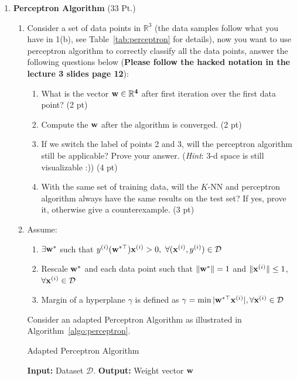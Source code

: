 \documentclass{article}
\theoremstyle{definition}
\theoremstyle{remark}
\newenvironment{Q}
        {%
          \clearpage
          \item
        }
        {%
          \phantom{s} 
          \bigskip
        }
\begin{document}
\begin{enumerate}[font={\Large\bfseries},left=0pt]
\begin{Q}
\textbf{\Large Perceptron Algorithm} (33 Pt.)
\begin{enumerate}
    \item Consider a set of data points in $\mathbb{R}^3$ (the data samples follow
what you have in 1(b), see Table~\ref{tab:perceptron} for details)\label{}, now you want to use perceptron algorithm to correctly classify all the data points, answer the following questions below (\textbf{Please follow the hacked notation in the lecture 3 slides page 12}):
      
      \begin{enumerate}
          \item    What is the vector $\bf{w} \in \mathbb{R}^4$ after first iteration over the first data point? (2 pt)
          \item    Compute the $\bf{w}$ after the algorithm is converged. (2 pt)
          \item    If we switch the label of points 2 and 3, will the perceptron algorithm still be applicable? Prove your answer. (\textit{Hint}: 3-d space is still visualizable :)) (4 pt)
        \item With the same set of training data, will the $K$-NN and perceptron algorithm always have the same results on the test set? If yes, prove it, otherwise give a counterexample. (3 pt)
      \end{enumerate}


    


     \item 
    Assume:
    \begin{enumerate}
    \item $\exists {\bf w}^*$ such that $y^{(i)}({\bf w}^{*\top}){\bf x}^{(i)}>0,\ \forall ({\bf x}^{(i)}, y^{(i)})\in\mathcal{D}$
\item Rescale ${\bf w}^*$ and each data point such that $\|{\bf w}^*\|=1$ and $\|{\bf x}^{(i)}\|\leq 1$, $\forall {\bf x}^{(i)}\in\mathcal{D}$
\item Margin of a hyperplane $\gamma$ is defined as $\gamma=\min | {\bf w}^{*\top}{\bf x}^{(i)}|, \forall {\bf x}^{(i)}\in\mathcal{D}$
    \end{enumerate}
    Consider an adapted Perceptron Algorithm as illustrated in Algorithm~\ref{algo:perceptron}. 

    
    \begin{algorithm}
    \caption{Adapted Perceptron Algorithm}
    \label{algo:perceptron}
    \begin{algorithmic}[1]
    \STATE \textbf{Input:} Dataset $\mathcal{D}$.
    \STATE \textbf{Output:} Weight vector ${\bf w}$


\end{algorithmic}
\end{algorithm}
\end{enumerate}
\end{Q}
\end{enumerate}
\end{document}
